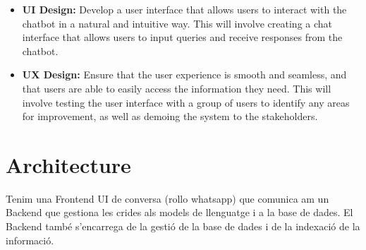 \documentclass[a4paper,12pt,twoside]{ThesisStyle}
\begin{document}
\begin{itemize}
  \item \textbf{UI Design:} Develop a user interface that allows users to interact with the chatbot in a natural and intuitive way. This will involve creating a chat interface that allows users to input queries and receive responses from the chatbot.
  \item \textbf{UX Design:} Ensure that the user experience is smooth and seamless, and that users are able to easily access the information they need. This will involve testing the user interface with a group of users to identify any areas for improvement, as well as demoing the system to the stakeholders.
\end{itemize}


\section{Architecture}

Tenim una Frontend UI de conversa (rollo whatsapp) que comunica am un Backend que gestiona les crides als models de llenguatge i a la base de dades. El Backend també s'encarrega de la gestió de la base de dades i de la indexació de la informació.
\end{document}

